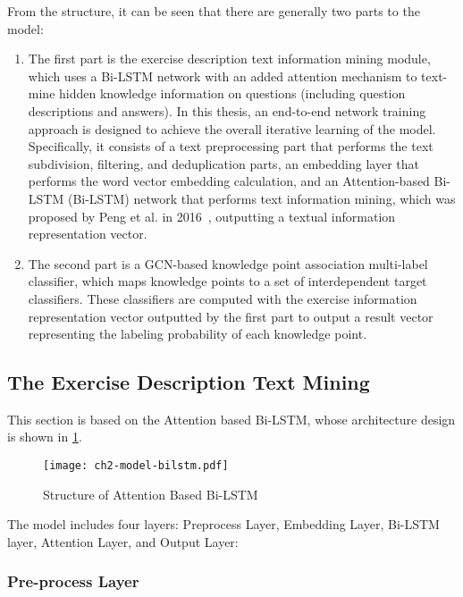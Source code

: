From the structure, it can be seen that there are generally two parts to the model:
\begin{enumerate}
	\item The first part is the exercise description text information mining module, which uses a Bi-LSTM network with an added attention mechanism to text-mine hidden knowledge information on questions (including question descriptions and answers). In this thesis, an end-to-end network training approach is designed to achieve the overall iterative learning of the model. Specifically, it consists of a text preprocessing part that performs the text subdivision, filtering, and deduplication parts, an embedding layer that performs the word vector embedding calculation, and an Attention-based Bi-LSTM (Bi-LSTM) network that performs text information mining, which was proposed by Peng et al. in 2016~\cite{zhou2016attention}, outputting a textual information representation vector.
	\item The second part is a GCN-based knowledge point association multi-label classifier, which maps knowledge points to a set of interdependent target classifiers. These classifiers are computed with the exercise information representation vector outputted by the first part to output a result vector representing the labeling probability of each knowledge point.
\end{enumerate}


\subsection{The Exercise Description Text Mining}
This section is based on the Attention based Bi-LSTM, whose architecture design is shown in \figurename{\ref{fig:ch2-model-bilstm}}.
\begin{figure}[H]
	\centering
	\texttt{[image: ch2-model-bilstm.pdf]}
	\caption{Structure of Attention Based Bi-LSTM}\label{fig:ch2-model-bilstm}
\end{figure}

The model includes four layers: Preprocess Layer, Embedding Layer, Bi-LSTM layer, Attention Layer, and Output Layer:
\subsubsection{Pre-process Layer}


